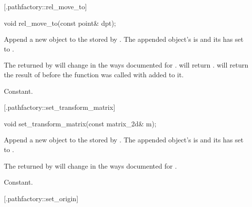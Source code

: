  [\iotwod.pathfactory::rel_move_to] {}

%
%
\begin{itemdecl}
void rel_move_to(const point& dpt);
\end{itemdecl}
\begin{itemdescr}
	\pnum
	\effects
	Append a new  object to the  stored by 
	. The appended object's  is 
	 and its  has 
	 set to .
	
	\pnum
	\postconditions
	The  returned by  will change 
	in the ways documented for .
	 will return . 
	 will return the result of 
	 before the function was called with 
	 added to it.
	
	\pnum
	\complexity
	Constant.
\end{itemdescr}

 [\iotwod.pathfactory::set_transform_matrix] 
{}

%
%
\begin{itemdecl}
void set_transform_matrix(const matrix_2d& m);
\end{itemdecl}
\begin{itemdescr}
	\pnum
	\effects
	Append a new  object to the  stored by 
	. The appended object's  is 
	 and its  has 
	 set to .
	
	\pnum
	\postconditions
	The  returned by  will change 
	in the ways documented for .
	
	\pnum
	\complexity
	Constant.
\end{itemdescr}

 [\iotwod.pathfactory::set_origin] {}

